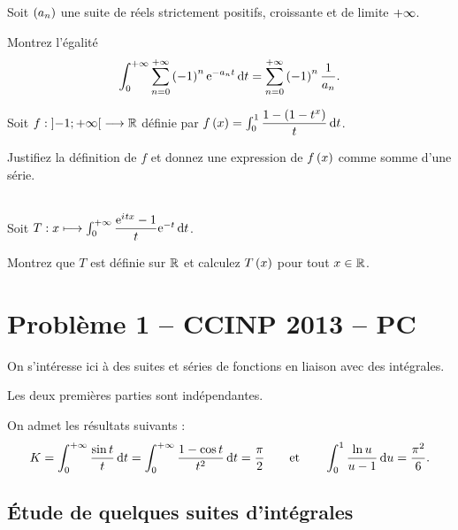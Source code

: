 \begin{exo}
Soit \(\left(a_n\right)\) une suite de réels strictement positifs, croissante et de limite \(+\infty\).

Montrez l'égalité \[\int_0^{\pinf}\sum_{n=0}^{\pinf}\paren{-1}^n\e{-a_nt}\odif{t}=\sum_{n=0}^{\pinf}\paren{-1}^n\dfrac{1}{a_n}.\]
\end{exo}

\begin{exo}
Soit \(f:\left]-1;+\infty\right[\longrightarrow\mathbb{R}\) définie par \(f\paren{x}=\int_0^1\dfrac{1-\paren{1-t^x}}{t}\odif{t}\).

Justifiez la définition de \(f\) et donnez une expression de \(f\left(x\right)\) comme somme d'une série.
\end{exo}

\begin{exo}~\\
Soit \(T:x\mapsto\int_0^{\pinf}\dfrac{\e{\i tx}-1}{t}\e{-t}\odif{t}\).

Montrez que \(T\) est définie sur \(\mathbb{R}\) et calculez \(T\left(x\right)\) pour tout \(x\in\mathbb{R}\).
\end{exo}

\section*{Problème 1 -- CCINP 2013 -- PC}

On s'intéresse ici à des suites et séries de fonctions en liaison avec des intégrales.

Les deux premières parties sont indépendantes.

On admet les résultats suivants : \[K=\int_0^{\pinf}\dfrac{\sin t}{t}\odif{t}=\int_0^{\pinf}\dfrac{1-\cos t}{t^2}\odif{t}=\dfrac{\pi}{2}\qquad\text{et}\qquad\int_0^1\dfrac{\ln u}{u-1}\odif{u}=\dfrac{\pi^2}{6}.\]

\subsection*{Étude de quelques suites d'intégrales}

